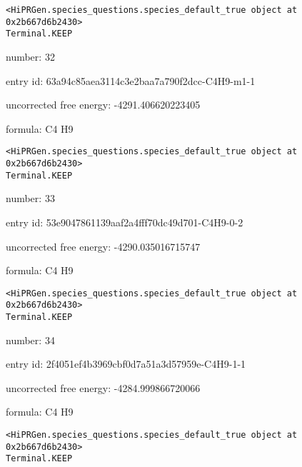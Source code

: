 \documentclass{article}
\begin{document}
\vspace{1cm}
\begin{verbatim}
<HiPRGen.species_questions.species_default_true object at 0x2b667d6b2430>
Terminal.KEEP
\end{verbatim}


number: 32



entry id: 63a94c85aea3114c3e2baa7a790f2dcc-C4H9-m1-1



uncorrected free energy: -4291.406620223405



formula: C4 H9


\vspace{1cm}
\begin{verbatim}
<HiPRGen.species_questions.species_default_true object at 0x2b667d6b2430>
Terminal.KEEP
\end{verbatim}


number: 33



entry id: 53e9047861139aaf2a4fff70dc49d701-C4H9-0-2



uncorrected free energy: -4290.035016715747



formula: C4 H9


\vspace{1cm}
\begin{verbatim}
<HiPRGen.species_questions.species_default_true object at 0x2b667d6b2430>
Terminal.KEEP
\end{verbatim}


number: 34



entry id: 2f4051ef4b3969cbf0d7a51a3d57959e-C4H9-1-1



uncorrected free energy: -4284.999866720066



formula: C4 H9


\vspace{1cm}
\begin{verbatim}
<HiPRGen.species_questions.species_default_true object at 0x2b667d6b2430>
Terminal.KEEP
\end{verbatim}
\end{document}
